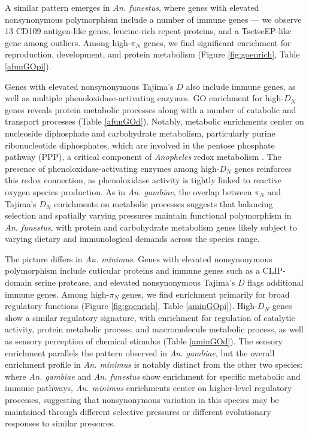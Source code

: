 A similar pattern emerges in \textit{An. funestus},
where genes with elevated nonsynonymous polymorphism
include a number of immune genes ---
we observe 13 CD109 antigen-like genes, leucine-rich repeat proteins,
and a TsetseEP-like gene among outliers.
Among high-$\pi_{N}$ genes, we find significant enrichment
for reproduction, development, and protein metabolism
(Figure \ref{fig:goenrich}, Table \ref{afunGOpi}).

Genes with elevated nonsynonymous Tajima's $D$ also include immune genes,
as well as multiple phenoloxidase-activating enzymes.
GO enrichment for high-$D_{N}$ genes reveals protein metabolic processes
along with a number of catabolic and transport processes
(Table \ref{afunGOd}).
Notably, metabolic enrichments center on nucleoside diphosphate
and carbohydrate metabolism,
particularly purine ribonucleotide diphosphates,
which are involved in the pentose phosphate pathway (PPP),
a critical component of \textit{Anopheles} redox metabolism
\citep{Kanehisa_Furumichi_Sato_Matsuura_Ishiguro-Watanabe_2024}.
The presence of phenoloxidase-activating enzymes among high-$D_{N}$ genes
reinforces this redox connection,
as phenoloxidase activity is tightly linked to reactive oxygen species production.
As in \textit{An. gambiae}, the overlap between $\pi_{N}$ and Tajima's $D_{N}$
enrichments on metabolic processes suggests that balancing selection
and spatially varying pressures maintain functional polymorphism
in \textit{An. funestus},
with protein and carbohydrate metabolism genes
likely subject to varying dietary and immunological demands across the species range.

The picture differs in \textit{An. minimus}.
Genes with elevated nonsynonymous polymorphism
include cuticular proteins and immune genes such as a CLIP-domain serine protease,
and elevated nonsynonymous Tajima's $D$ flags additional immune genes.
Among high-$\pi_{N}$ genes, we find enrichment primarily
for broad regulatory functions
(Figure \ref{fig:goenrich}, Table \ref{aminGOpi}).
High-$D_N$ genes show a similar regulatory signature,
with enrichment for regulation of catalytic activity,
protein metabolic process, and macromolecule metabolic process,
as well as sensory perception of chemical stimulus
(Table \ref{aminGOd}).
The sensory enrichment parallels the pattern observed in \textit{An. gambiae},
but the overall enrichment profile in \textit{An. minimus}
is notably distinct from the other two species:
where \textit{An. gambiae} and \textit{An. funestus} show enrichment
for specific metabolic and immune pathways,
\textit{An. minimus} enrichments center on higher-level regulatory processes,
suggesting that nonsynonymous variation in this species
may be maintained through different selective pressures
or different evolutionary responses to similar pressures.

